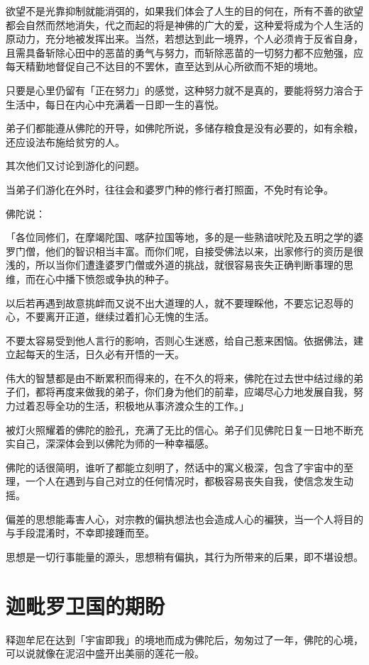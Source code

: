 \documentclass[twoside,openany]{book}
\begin{document}
欲望不是光靠抑制就能消弭的，如果我们体会了人生的目的何在，所有不善的欲望都会自然而然地消失，代之而起的将是神佛的广大的爱，这种爱将成为个人生活的原动力，充分地被发挥出来。当然，若想达到此一境界，个人必须肯于反省自身，且需具备斩除心田中的恶苗的勇气与努力，而斩除恶苗的一切努力都不应勉强，应每天精勤地督促自己不达目的不罢休，直至达到从心所欲而不矩的境地。

只要是心里仍留有「正在努力」的感觉，这种努力就不是真的，要能将努力溶合于生活中，每日在内心中充满着一日即一生的喜悦。

弟子们都能遵从佛陀的开导，如佛陀所说，多储存粮食是没有必要的，如有余粮，还应设法布施给贫穷的人。

其次他们又讨论到游化的问题。

当弟子们游化在外时，往往会和婆罗门种的修行者打照面，不免时有论争。

佛陀说：

「各位同修们，在摩竭陀国、喀萨拉国等地，多的是一些熟谙吠陀及五明之学的婆罗门僧，他们的智识相当丰富。而你们呢，自接受佛法以来，出家修行的资历是很浅的，所以当你们遭逢婆罗门僧或外道的挑战，就很容易丧失正确判断事理的思维，而在心中播下愤怨或争执的种子。

以后若再遇到故意挑衅而又说不出大道理的人，就不要理睬他，不要忘记忍辱的心，不要离开正道，继续过着扪心无愧的生活。

不要太容易受到他人言行的影响，否则心生迷惑，给自己惹来困恼。依据佛法，建立起每天的生活，日久必有开悟的一天。

伟大的智慧都是由不断累积而得来的，在不久的将来，佛陀在过去世中结过缘的弟子们，都将再度来做我的弟子，你们身为他们的前辈，应竭尽心力地发展自我，努力过着忍辱全功的生活，积极地从事济渡众生的工作。」

被灯火照耀着的佛陀的脸孔，充满了无比的信心。弟子们见佛陀日复一日地不断充实自己，深深体会到以佛陀为师的一种幸福感。

佛陀的话很简明，谁听了都能立刻明了，然话中的寓义极深，包含了宇宙中的至理，一个人在遇到与自己对立的任何情况时，都极容易丧失自我，使信念发生动摇。

偏差的思想能毒害人心，对宗教的偏执想法也会造成人心的褊狭，当一个人将目的与手段混淆时，不幸即接踵而至。

思想是一切行事能量的源头，思想稍有偏执，其行为所带来的后果，即不堪设想。

\section{迦毗罗卫国的期盼}\label{sec3.13}

释迦牟尼在达到「宇宙即我」的境地而成为佛陀后，匆匆过了一年，佛陀的心境，可以说就像在泥沼中盛开出美丽的莲花一般。
\end{document}
